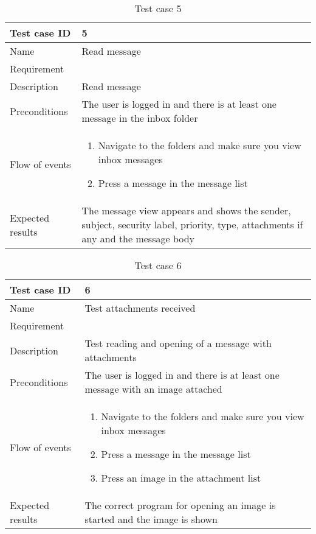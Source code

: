 \begin{table}
\begin{tabular}{l|p{10cm}}
Test case ID & 5 \\ \hline
Name & Read message\\ \hline
Requirement & \\ \hline
Description & Read message\\ \hline
Preconditions & The user is logged in and there is at least one message in the inbox folder\\ \hline
Flow of events & 
\begin{enumerate}
\item{}Navigate to the folders and make sure you view inbox messages
\item{}Press a message in the message list
\end{enumerate} \\ \hline
Expected results & The message view appears and shows the sender, subject, security label, priority, type, attachments if any and the message body
\end{tabular}
\caption{Test case 5} \label{tab:case5}
\end{table}

\begin{table}
\begin{tabular}{l|p{10cm}}
Test case ID & 6 \\ \hline
Name & Test attachments received\\ \hline
Requirement & \\ \hline
Description & Test reading and opening of a message with attachments\\ \hline
Preconditions & The user is logged in and there is at least one message with an image attached\\ \hline
Flow of events & 
\begin{enumerate}
\item{}Navigate to the folders and make sure you view inbox messages
\item{}Press a message in the message list
\item{}Press an image in the attachment list
\end{enumerate} \\ \hline
Expected results & The correct program for opening an image is started and the image is shown
\end{tabular}
\caption{Test case 6} \label{tab:case6}
\end{table}

